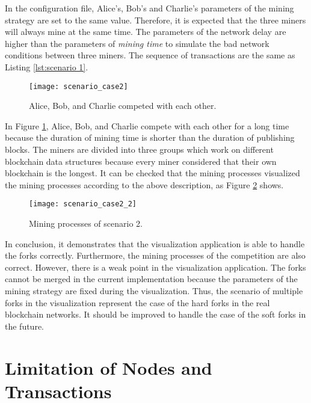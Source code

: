 In the configuration file, Alice's, Bob's and Charlie's parameters of the mining strategy are set to the same value. Therefore, it is expected that the three miners will always mine at the same time. The parameters of the network delay are higher than the parameters of \textit{mining time} to simulate the bad network conditions between three miners. The sequence of transactions are the same as Listing \ref{lst:scenario 1}.

\begin{figure}[htb]
    \centering
    \texttt{[image: scenario\_case2]}
    \caption{Alice, Bob, and Charlie competed with each other.}
    \label{fig:alice, bob, and charlie competed with each other}
\end{figure}

In Figure \ref{fig:alice, bob, and charlie competed with each other}, Alice, Bob, and Charlie compete with each other for a long time because the duration of mining time is shorter than the duration of publishing blocks. The miners are divided into three groups which work on different blockchain data structures because every miner considered that their own blockchain is the longest. It can be checked that the mining processes visualized the mining processes according to the above description, as Figure \ref{fig:mining processes of scenario 2} shows.

\begin{figure}[htb]
    \centering
    \texttt{[image: scenario\_case2\_2]}
    \caption{Mining processes of scenario 2.}
    \label{fig:mining processes of scenario 2}
\end{figure}

In conclusion, it demonstrates that the visualization application is able to handle the forks correctly. Furthermore, the mining processes of the competition are also correct. However, there is a weak point in the visualization application. The forks cannot be merged in the current implementation because the parameters of the mining strategy are fixed during the visualization. Thus, the scenario of multiple forks in the visualization represent the case of the hard forks in the real blockchain networks. It should be improved to handle the case of the soft forks in the future.

\section{Limitation of Nodes and Transactions}

